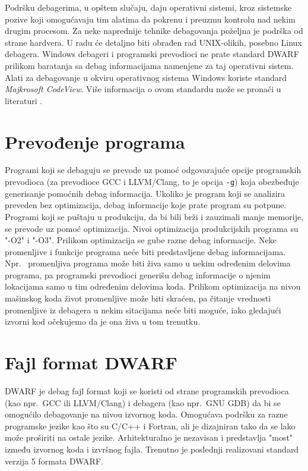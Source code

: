 \documentclass[12pt,oneside]{memoir}
\begin{document}
Podršku debagerima, u opštem slučaju, daju operativni sistemi, kroz sistemske pozive koji omogućavaju tim alatima da pokrenu i preuzmu kontrolu nad nekim drugim procesom. Za neke naprednije tehnike debagovanja poželjna je podrška od strane hardvera. U radu će detaljno biti obrađen rad UNIX-olikih, posebno Linux debagera. Windows debageri i programski prevodioci ne prate standard DWARF \cite{DWARF} prilikom baratanja sa debag informacijama namenjene za taj operativni sistem. Alati za debagovanje u okviru operativnog sistema Windows koriste standard \emph{Majkrosoft CodeView}.  Više informacija o ovom standardu može se pronaći u literaturi \cite{CodeView}.

\section{Prevođenje programa}

Programi koji se debaguju se prevode uz pomoć odgovarajuće opcije programskih prevodioca (za prevodioce GCC i LLVM/Clang, to je opcija \texttt{-g}) koja obezbeđuje generisanje pomoćnih debag informacija. Ukoliko je program koji se analizira preveden bez optimizacija, debag informacije koje prate program su potpune. Programi koji se puštaju u produkciju, da bi bili brži i zauzimali manje memorije, se prevode uz pomoć optimizacija. Nivoi optimizacija produkcijskih programa su "-O2" i "-O3". Prilikom optimizacija se gube razne debag informacije. Neke promenljive i funkcije programa neće biti predstavljene debag informacijama. Npr.~ promenljiva programa može biti živa samo u nekim određenim delovima programa, pa programski prevodioci generišu debag informacije o njenim lokacijama samo u tim određenim delovima koda. Prilikom optimizacija na nivou mašinskog koda život promenljive može biti skraćen, pa čitanje vrednosti promenljive iz debagera u nekim sitacijama neće biti moguće, iako gledajući izvorni kod očekujemo da je ona živa u tom trenutku.

\section{Fajl format DWARF}

DWARF je debag fajl format koji se koristi od strane programskih prevodioca (kao npr.~GCC ili LLVM/Clang) i debagera (kao npr.~GNU GDB) da bi se omogućilo debagovanje na nivou izvornog koda. Omogućava podršku za razne programske jezike kao što su C/C++ i Fortran, ali je dizajniran tako da se lako može proširiti na ostale jezike. Arhitekturalno je nezavisan i predstavlja "most" između izvornog koda i izvršnog fajla. Trenutno je poslednji realizovani standard verzija 5 formata DWARF.
\end{document}
